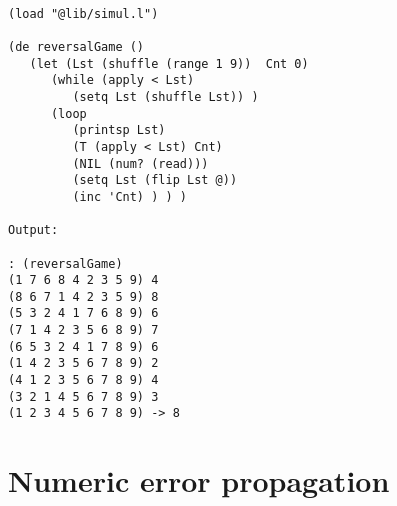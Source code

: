 \begin{verbatim}

(load "@lib/simul.l")

(de reversalGame ()
   (let (Lst (shuffle (range 1 9))  Cnt 0)
      (while (apply < Lst)
         (setq Lst (shuffle Lst)) )
      (loop
         (printsp Lst)
         (T (apply < Lst) Cnt)
         (NIL (num? (read)))
         (setq Lst (flip Lst @))
         (inc 'Cnt) ) ) )

Output:

: (reversalGame)
(1 7 6 8 4 2 3 5 9) 4
(8 6 7 1 4 2 3 5 9) 8
(5 3 2 4 1 7 6 8 9) 6
(7 1 4 2 3 5 6 8 9) 7
(6 5 3 2 4 1 7 8 9) 6
(1 4 2 3 5 6 7 8 9) 2
(4 1 2 3 5 6 7 8 9) 4
(3 2 1 4 5 6 7 8 9) 3
(1 2 3 4 5 6 7 8 9) -> 8

\end{verbatim}

\section*{Numeric error propagation}

